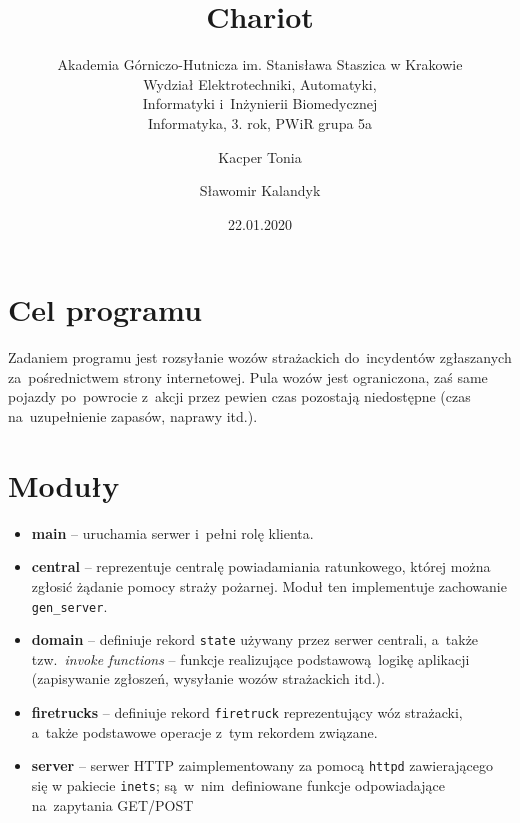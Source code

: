 \documentclass{article}
\title{Chariot}
\subtitle{Akademia Górniczo-Hutnicza im. Stanisława Staszica w Krakowie\\
	Wydział Elektrotechniki, Automatyki,\\
	Informatyki i~Inżynierii Biomedycznej\\
	Informatyka, 3. rok, PWiR grupa 5a}
\author{Kacper Tonia\and
		Sławomir Kalandyk}
\date{22.01.2020}
\begin{document}
\maketitle

\section{Cel programu}
Zadaniem programu jest rozsyłanie wozów strażackich do~incydentów zgłaszanych za~pośrednictwem strony internetowej. Pula wozów jest ograniczona, zaś same pojazdy po~powrocie z~akcji przez pewien czas pozostają niedostępne (czas na~uzupełnienie zapasów, naprawy itd.).
\section{Moduły}
\begin{itemize}
	\item \textbf{main} -- uruchamia serwer i~pełni rolę klienta.
	\item \textbf{central} -- reprezentuje centralę powiadamiania ratunkowego, której można zgłosić żądanie pomocy straży pożarnej. Moduł ten implementuje zachowanie \texttt{gen\_server}.
	\item \textbf{domain} -- definiuje rekord \texttt{state} używany przez serwer centrali, a~także tzw.~\emph{invoke functions} -- funkcje realizujące podstawową logikę aplikacji (zapisywanie zgłoszeń, wysyłanie wozów strażackich itd.).
	\item \textbf{firetrucks} -- definiuje rekord \texttt{firetruck} reprezentujący wóz strażacki, a~także podstawowe operacje z~tym rekordem związane.
	\item \textbf{server} -- serwer HTTP zaimplementowany za pomocą \texttt{httpd} zawierającego się w pakiecie \texttt{inets}; są~w~nim~definiowane funkcje odpowiadające na~zapytania GET/POST
\end{itemize}
\end{document}
